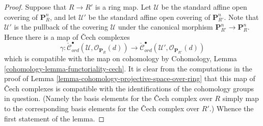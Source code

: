 \documentclass{stacks-project}
\theoremstyle{plain}
\theoremstyle{definition}
\theoremstyle{remark}
\numberwithin{equation}{subsection}
\begin{document}
\begin{proof}
Suppose that $R \to R'$ is a ring map.
Let $\mathcal{U}$ be the standard affine open covering of $\mathbf{P}^n_R$,
and let $\mathcal{U}'$ be the standard affine open covering of
$\mathbf{P}^n_{R'}$. Note that $\mathcal{U}'$ is the pullback of the covering
$\mathcal{U}$ under the canonical morphism
$\mathbf{P}^n_{R'} \to \mathbf{P}^n_R$. Hence there
is a map of {\v C}ech complexes
$$
\gamma :
\check{\mathcal{C}}_{ord}^\bullet(\mathcal{U},
\mathcal{O}_{\mathbf{P}_R}(d))
\longrightarrow
\check{\mathcal{C}}_{ord}^\bullet(\mathcal{U}',
\mathcal{O}_{\mathbf{P}_{R'}}(d))
$$
which is compatible with the map on cohomology by
Cohomology, Lemma \ref{cohomology-lemma-functoriality-cech}.
It is clear from the computations in the proof of
Lemma \ref{lemma-cohomology-projective-space-over-ring}
that this map of {\v C}ech complexes is compatible with the identifications
of the cohomology groups in question. (Namely the basis elements for
the {\v C}ech complex over $R$ simply map to the corresponding basis elements
for the {\v C}ech complex over $R'$.) Whence the first statement of the lemma.


\end{proof}
\end{document}
